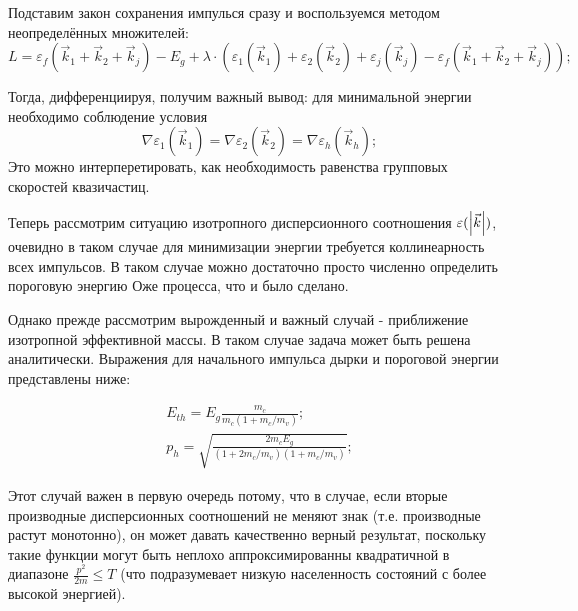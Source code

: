 \documentclass[../main.tex]{subfiles}
\begin{document}
        Подставим закон сохранения импулься сразу и воспользуемся методом неопределённых множителей:
        \begin{equation}
            L = \varepsilon_f(\vec{k}_1 + \vec{k}_2 + \vec{k}_j) - E_g + \lambda \cdot \left(\varepsilon_1(\vec{k}_1) + 
            \varepsilon_2(\vec{k}_2) + \varepsilon_j(\vec{k}_j) - \varepsilon_f(\vec{k}_1 + \vec{k}_2 + \vec{k}_j)\right);
        \end{equation}

        Тогда, дифференциируя, получим важный  вывод: для минимальной энергии необходимо соблюдение условия
        \begin{equation}
            \nabla \varepsilon_1(\vec{k}_1) = \nabla \varepsilon_2(\vec{k}_2) = \nabla \varepsilon_h(\vec{k}_h);
        \end{equation}
        Это можно интерперетировать, как необходимость равенства групповых скоростей квазичастиц.

        Теперь рассмотрим ситуацию изотропного дисперсионного соотношения $\varepsilon(\abs{\vec k})$,
        очевидно в таком случае для минимизации энергии требуется коллинеарность всех импульсов. 
        В таком случае можно достаточно просто численно определить пороговую энергию Оже процесса, что и было сделано.

        Однако прежде рассмотрим вырожденный и важный случай - приближение изотропной эффективной массы.
        В таком случае задача может быть решена аналитически. Выражения для начального импульса дырки
        и пороговой энергии представлены ниже:

        \begin{equation}
            \begin{array}{l}
                E_{th} = E_g \frac{m_c}{m_c ( 1 + m_c / m_v)};\\
                p_{h} = \sqrt{\frac{2m_c E_g}{(1+ 2m_c/m_v)(1+ m_c / m_v)}};
            \end{array}
        \end{equation}

        Этот случай важен в первую очередь потому, что в случае, если вторые производные дисперсионных соотношений не меняют знак
        (т.е. производные растут монотонно), он может давать качественно верный результат, поскольку такие функции могут быть
        неплохо аппроксимированны квадратичной в диапазоне $\frac{p^2}{2m} \leq T$ (что подразумевает низкую населенность состояний
        с более высокой энергией).
\end{document}
